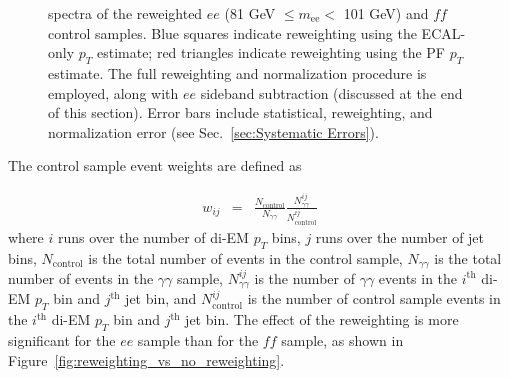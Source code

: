 \documentclass[dissertation.tex]{subfiles}
\begin{document}
\begin{figure}
	\hspace{1cm}
	\caption{\MET spectra of the reweighted $ee$ (81 GeV $\leq m_{\mathrm{ee}} <$ 101 GeV) and $\mathit{ff}$ control samples.  Blue squares indicate reweighting using the ECAL-only $p_{T}$ estimate; red triangles indicate reweighting using the PF $p_{T}$ estimate.  The full reweighting and normalization procedure is employed, along with $ee$ sideband subtraction (discussed at the end of this section).  Error bars include statistical, reweighting, and normalization error (see Sec.~\ref{sec:Systematic Errors}).}
	\label{fig:ee_vs_ff_di-EM_vs_dijet_pT_reweighting}
\end{figure}

The control sample event weights are defined as

\begin{eqnarray}
w_{ij} &=& \frac{N_{\mathrm{control}}}{N_{\gamma\gamma}}\frac{N_{\gamma\gamma}^{ij}}{N_{\mathrm{control}}^{ij}}
\end{eqnarray}
%
where $i$ runs over the number of di-EM $p_{T}$ bins, $j$ runs over the number of jet bins, $N_{\mathrm{control}}$ is the total number of events in the control sample, $N_{\gamma\gamma}$ is the total number of events in the $\gamma\gamma$ sample, $N_{\gamma\gamma}^{ij}$ is the number of $\gamma\gamma$ events in the $i^{\mathrm{th}}$ di-EM $p_{T}$ bin and $j^{\mathrm{th}}$ jet bin, and $N_{\mathrm{control}}^{ij}$ is the number of control sample events in the $i^{\mathrm{th}}$ di-EM $p_{T}$ bin and $j^{\mathrm{th}}$ jet bin.  The effect of the reweighting is more significant for the $ee$ sample than for the $\mathit{ff}$ sample, as shown in Figure~\ref{fig:reweighting_vs_no_reweighting}.
\end{document}
